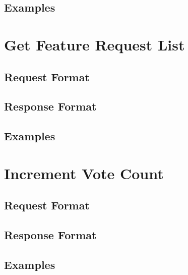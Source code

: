\subsection{Examples}


\section{Get Feature Request List}


\subsection{Request Format}


\subsection{Response Format}


\subsection{Examples}


\section{Increment Vote Count}


\subsection{Request Format}


\subsection{Response Format}


\subsection{Examples}
